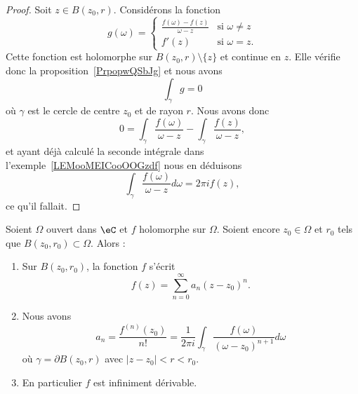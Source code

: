 \begin{proof}
	Soit \( z\in B(z_0,r)\). Considérons la fonction
	\begin{equation}
		g(\omega)=\begin{cases}
			\frac{ f(\omega)-f(z) }{ \omega-z } & \text{si } \omega\neq z \\
			f'(z)                               & \text{si } \omega=z.
		\end{cases}
	\end{equation}
	Cette fonction est holomorphe sur \( B(z_0,r)\setminus\{ z \}\) et continue en \( z\). Elle vérifie donc la proposition~\ref{PrpopwQSbJg} et nous avons
	\begin{equation}
		\int_{\gamma}g=0
	\end{equation}
	où \( \gamma\) est le cercle de centre \( z_0\) et de rayon \( r\). Nous avons donc
	\begin{equation}
		0=\int_{\gamma}\frac{ f(\omega) }{ \omega-z }-\int_{\gamma}\frac{ f(z) }{ \omega-z },
	\end{equation}
	et ayant déjà calculé la seconde intégrale dans l'exemple~\ref{LEMooMEICooOOGzdf} nous en déduisons
	\begin{equation}
		\int_{\gamma}\frac{ f(\omega) }{ \omega-z }d\omega=2\pi if(z),
	\end{equation}
	ce qu'il fallait.
\end{proof}

\begin{theorem}     \label{ThomcPOdd}
	Soient \( \Omega\) ouvert dans \( \eC\) et \( f\) holomorphe sur \( \Omega\). Soient encore \( z_0\in \Omega\) et \( r_0\) tels que \( B(z_0,r_0)\subset \Omega\). Alors :
	\begin{enumerate}
		\item       \label{ITEMooYWSOooHJtxGr}
		      Sur \( B(z_0,r_0)\), la fonction \( f\) s'écrit
		      \begin{equation}
			      f(z)=\sum_{n=0}^{\infty}a_n(z-z_0)^n.
		      \end{equation}
		\item
		      Nous avons
		      \begin{equation}
			      a_n=\frac{ f^{(n)}(z_0) }{ n! }=\frac{1}{ 2\pi i }\int_{\gamma}\frac{ f(\omega) }{ (\omega-z_0)^{n+1} }d\omega
		      \end{equation}
		      où \( \gamma=\partial B(z_0,r)\) avec \( | z-z_0 |<r<r_0\).
		\item   \label{ItemMRRTooMChmuZ}
		      En particulier \( f\) est infiniment dérivable.
	\end{enumerate}
\end{theorem}


